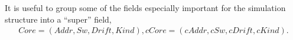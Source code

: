 \documentclass[12pt]{memoir}
\newcommand{\fld}[1]{\ensuremath{\textit{#1}}}
\newcommand{\Z}{Z}
\newcommand{\Addr}{\fld{Addr}}
\newcommand{\cAddr}{\fld{cAddr}}
\newcommand{\Core}{\fld{Core}}
\newcommand{\cCore}{\fld{cCore}}
\newcommand{\Drift}{\fld{Drift}}
\newcommand{\cDrift}{\fld{cDrift}}
\newcommand{\Kind}{\fld{Kind}}
\newcommand{\cKind}{\fld{cKind}}
\newcommand{\Sweep}{\fld{Sw}}
\newcommand{\cSweep}{\fld{cSw}}
\newcommand{\ZigDepth}{\fld{ZigDepth}}
\newcommand{\ZigDir}{\fld{ZigDir}}
\begin{document}
It is useful to group some of the fields especially important for the simulation structure into
a ``super'' field,
    \begin{align}\label{eq:Core}
       \Core=(\Addr, \Sweep, \Drift, \Kind), 
        \cCore=(\cAddr, \cSweep, \cDrift, \cKind). %
    \end{align}







\end{document}
